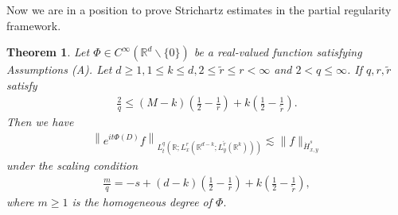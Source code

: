 \documentclass[a4paper,11pt, reqno]{amsart}
\newtheorem{theorem}{Theorem}[section]
\theoremstyle{definition}
\theoremstyle{remark}
\numberwithin{equation}{section}
\begin{document}
        
	Now we are in a position to prove  Strichartz estimates in the partial regularity framework.
	\begin{theorem} \label{eq13} Let $\Phi \in C^{\infty}\left(\mathbb{R}^{d} \backslash\{0\}\right)$ be a real-valued function satisfying Assumptions (A).
		Let $d \geq 1,  1 \leq k \leq d, 2 \leq \widetilde{r} \leq r<\infty $ and $ 2<q \leq \infty$. If $ q, r, \tilde{r}$ satisfy 
		\begin{align}\label{eq0}
			\frac{2}{q} \leq(M-k)\left(\frac{1}{2}-\frac{1}{r}\right)+k\left(\frac{1}{2}-\frac{1}{\widetilde{r}}\right). 
		\end{align}
		Then we have
		\begin{align}\label{eq1}
			\left\|e^{i t\Phi(D)} f\right\|_{L_t^q\left(\mathbb{R} ; L_x^r\left(\mathbb{R}^{d-k} ; L_y^{\tilde{r}}\left(\mathbb{R}^k\right)\right)\right)} \lesssim\|f\|_{\dot{H}_{x, y}^s}
		\end{align}
		under the scaling condition
		\begin{align}\label{eq2}
			\frac{{{m}}}{q}=-s +(d-k)\left(\frac{1}{2}-\frac{1}{r}\right)+k\left(\frac{1}{2}-\frac{1}{\widetilde{r}}\right),
		\end{align} where $m \geq 1$ is the homogeneous degree of $\Phi.$
		
	\end{theorem}   
\end{document}
